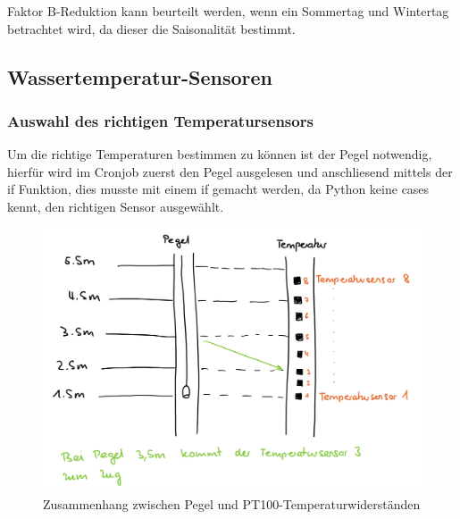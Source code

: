 Faktor B-Reduktion kann beurteilt werden, wenn ein Sommertag und Wintertag betrachtet wird, da dieser die Saisonalität bestimmt.


\subsection{Wassertemperatur-Sensoren}

\subsubsection{Auswahl des richtigen Temperatursensors}
Um die richtige Temperaturen bestimmen zu können ist der Pegel notwendig, hierfür wird im Cronjob zuerst den Pegel ausgelesen und anschliesend mittels der if Funktion, dies musste mit einem if gemacht werden, da Python keine cases kennt, den richtigen Sensor ausgewählt.

\begin{figure}[h]
	\centering
	\includegraphics[width=0.9\linewidth]{img/wassertempsensoren.png}
	\caption{Zusammenhang zwischen Pegel und PT100-Temperaturwiderständen}
	\label{img:wassertempsensoren}
\end{figure}
